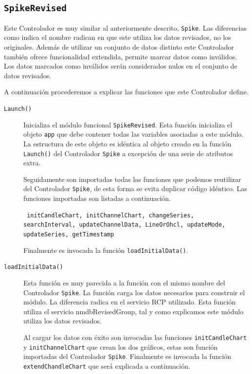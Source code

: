	\subsection{\texttt{SpikeRevised}}
		Este Controlador es muy similar al anteriormente descrito, \texttt{Spike}. Las diferencias como indica el nombre radican en que este
		utiliza los datos revisados, no los originales. Además de utilizar un conjunto de datos distinto este Controlador también ofrece
		funcionalidad extendida, permite marcar datos como inválidos. Los datos marcados como inválidos serán considerados nulos en el
		conjunto de datos revisados.
		\par
		A continuación procederemos a explicar las funciones que este Controlador define.
		\begin{description}
			\item[\texttt{Launch()}]
				Inicializa el módulo funcional \texttt{SpikeRevised}. Esta función inicializa el objeto \texttt{app} que debe contener
				todas las variables asociadas a este módulo. La estructura de este objeto es idéntica al objeto creado en la función
				\texttt{Launch()} del Controlador \texttt{Spike} a excepción de una serie de atributos extra. 
				\par
				Seguidamente son importadas todas las funciones que podemos reutilizar del Controlador \texttt{Spike}, de esta forma
				se evita duplicar código idéntico. Las funciones importadas son listadas a continuación.
					\begin{center} \texttt{	initCandleChart, initChannelChart, changeSeries, searchInterval, updateChannelData,
					  			LineOrOhcl, updateMode, updateSeries, getTimestamp}
					\end{center}
				Finalmente es invocada la función \texttt{loadInitialData()}.
		    	\item[\texttt{loadInitialData()}]
				Esta función es muy parecida a la función con el mismo nombre del Controlador \texttt{Spike}. La función carga los
				datos necesarios para construir el módulo. La diferencia radica en el servicio RCP utilizado. Esta función utiliza el
				servicio nmdbRevisedGroup, tal y como explicamos este módulo utiliza los datos revisados.
				\par
				Al cargar los datos con éxito son invocadas las funciones \texttt{initCandleChart} y \texttt{initChannelChart} que
				crean los dos gráficos, estas son función importadas del Controlador \texttt{Spike}. Finalmente es invocada la función
				\texttt{extendChandleChart} que será explicada a continuación.

\end{description}
